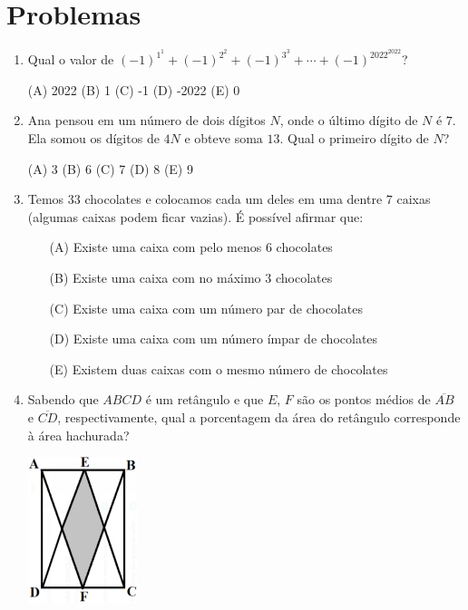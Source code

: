 \documentclass[12pt]{article}
\begin{document}
  \section{\textsf{Problemas}}
    \begin{enumerate}[label=\textbf{{\arabic*.}}]
      \item Qual o valor de $(-1)^{1^1} + (-1)^{2^2} + (-1)^{3^3} + \cdots + (-1)^{2022^{2022}}$?

(A) 2022 (B) 1 (C) -1 (D) -2022 (E) 0

\item Ana pensou em um número de dois dígitos $N$, onde o último dígito de $N$ é $7$. Ela somou os dígitos de $4N$ e obteve soma $13$. Qual o primeiro dígito de $N$?

(A) 3 (B) 6 (C) 7 (D) 8 (E) 9

\item Temos $33$ chocolates e colocamos cada um deles em uma dentre $7$ caixas (algumas caixas podem ficar vazias). É possível afirmar que:

\begin{enumerate}
\item[(A)] Existe uma caixa com pelo menos $6$ chocolates
\item[(B)] Existe uma caixa com no máximo $3$ chocolates
\item[(C)] Existe uma caixa com um número par de chocolates
\item[(D)] Existe uma caixa com um número ímpar de chocolates
\item[(E)] Existem duas caixas com o mesmo número de chocolates
\end{enumerate}

\item Sabendo que $ABCD$ é um retângulo e que $E$, $F$ são os pontos médios de $\overline{AB}$ e $\overline{CD}$, respectivamente, qual a porcentagem da área do retângulo corresponde à área hachurada?

  \begin{center}
  \includegraphics[width=0.25\textwidth]{first.png}
\end{center}



\end{enumerate}
\end{document}
